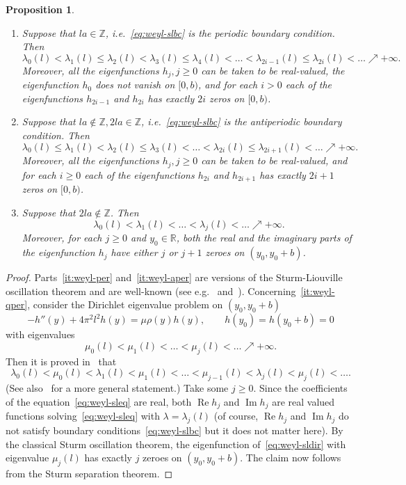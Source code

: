 \documentclass{amsart}
\let\le\leqslant
\let\ge\geqslant
\renewcommand{\Im}{\mathop{\mathrm{Im}}\nolimits}
\renewcommand{\Re}{\mathop{\mathrm{Re}}\nolimits}
\theoremstyle{plain}
\newtheorem{proposition}{Proposition}[section]
\theoremstyle{definition}
\theoremstyle{remark}
\begin{document}
\begin{proposition}\label{pr:weyl-sturm}
\begin{enumerate}[label=(\roman*)]
\item
Suppose that \(la\in\mathbb Z\), i.e.~\eqref{eq:weyl-slbc} is the
periodic boundary condition. Then
\[
\lambda_0(l)<\lambda_1(l)\le\lambda_2(l)<\lambda_3(l)\le\lambda_4(l)<\ldots
<\lambda_{2i-1}(l)\le\lambda_{2i}(l)<\ldots\nearrow +\infty.
\]
Moreover, all the eigenfunctions \(h_j,j\ge 0\) can be taken to be real-valued,
the eigenfunction \(h_0\) does not vanish on \([0,b)\), and for each
\(i>0\) each of the eigenfunctions \(h_{2i-1}\) and \(h_{2i}\) has exactly
\(2i\) zeros on \([0,b)\).\label{it:weyl-per}

\item
Suppose that \(la\notin\mathbb Z,2la\in\mathbb Z\), i.e.~\eqref{eq:weyl-slbc} is
the antiperiodic boundary condition. Then
\[
\lambda_0(l)\le\lambda_1(l)<\lambda_2(l)\le\lambda_3(l)<\ldots
<\lambda_{2i}(l)\le\lambda_{2i+1}(l)<\ldots\nearrow +\infty.
\]
Moreover, all the eigenfunctions \(h_j,j\ge 0\) can be taken to be real-valued,
and for each \(i\ge 0\) each of the eigenfunctions \(h_{2i}\) and \(h_{2i+1}\)
has exactly \(2i+1\) zeros on \([0,b)\).\label{it:weyl-aper}

\item
Suppose that \(2la\notin\mathbb Z\). Then
\[
\lambda_0(l)<\lambda_1(l)<\ldots<\lambda_j(l)<\ldots\nearrow +\infty.
\]
Moreover, for each \(j\ge 0\) and \(y_0\in\mathbb R\), both the real and the
imaginary parts of the eigenfunction \(h_j\) have either \(j\) or \(j+1\) zeroes
on \((y_0,y_0+b)\).\label{it:weyl-qper}
\end{enumerate}
\end{proposition}

\begin{proof}
Parts~\ref{it:weyl-per} and~\ref{it:weyl-aper} are versions of the
Sturm-Liouville oscillation theorem and are well-known (see
e.g.~\cite[Chapter~8]{CL1955} and~\cite[Theorem~3.1.2]{Eas1973}).
Concerning~\ref{it:weyl-qper}, consider the Dirichlet eigenvalue problem on
\((y_0,y_0+b)\)
\begin{equation}\label{eq:weyl-sldir}
-h''(y)+4\pi^2 l^2 h(y)=\mu\rho(y)h(y),\qquad
h(y_0)=h(y_0+b)=0
\end{equation}
with eigenvalues
\[
\mu_0(l)<\mu_1(l)<\ldots<\mu_j(l)<\ldots\nearrow +\infty.
\]
Then it is proved in~\cite[Sec.~3.1]{Eas1973} that
\[
\lambda_0(l)<\mu_0(l)<\lambda_1(l)<\mu_1(l)<\ldots<\mu_{j-1}(l)<\lambda_j(l)<
\mu_j(l)<\ldots.
\]
(See also~\cite{EKWZ1997} for a more general statement.) Take some \(j\ge 0\).
Since the coefficients of the equation~\eqref{eq:weyl-sleq} are real, both
\(\Re h_j\) and \(\Im h_j\) are real valued functions
solving~\eqref{eq:weyl-sleq} with \(\lambda=\lambda_j(l)\) (of course, \(\Re
h_j\) and \(\Im h_j\) do not satisfy boundary conditions~\eqref{eq:weyl-slbc}
but it does not matter here). By the classical Sturm oscillation theorem, the
eigenfunction of~\eqref{eq:weyl-sldir} with eigenvalue \(\mu_j(l)\) has exactly
\(j\) zeroes on \((y_0,y_0+b)\). The claim now follows from the Sturm separation
theorem.
\end{proof}
\end{document}
